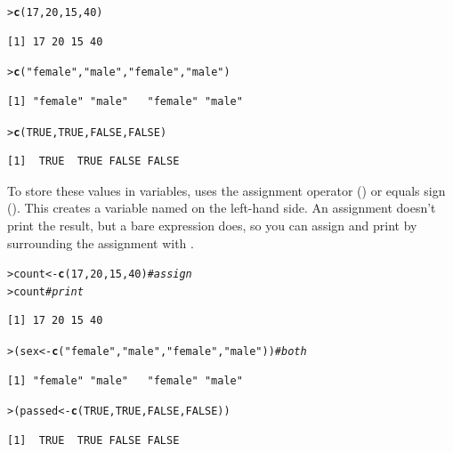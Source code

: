 \documentclass[10pt,krantz2]{krantz}\usepackage[]{graphicx}\usepackage[]{color}
\makeatletter
\newcommand{\hlnum}[1]{\textcolor[rgb]{0.686,0.059,0.569}{#1}}%
\newcommand{\hlstr}[1]{\textcolor[rgb]{0.192,0.494,0.8}{#1}}%
\newcommand{\hlcom}[1]{\textcolor[rgb]{0.678,0.584,0.686}{\textit{#1}}}%
\newcommand{\hlstd}[1]{\textcolor[rgb]{0.345,0.345,0.345}{#1}}%
\newcommand{\hlkwb}[1]{\textcolor[rgb]{0.69,0.353,0.396}{#1}}%
\newcommand{\hlkwd}[1]{\textcolor[rgb]{0.737,0.353,0.396}{\textbf{#1}}}%
\newenvironment{kframe}{%
 \def\at@end@of@kframe{}%
 \ifinner\ifhmode%
  \def\at@end@of@kframe{\end{minipage}}%
  \begin{minipage}{\columnwidth}%
 \fi\fi%
 \def\FrameCommand##1{\hskip\@totalleftmargin \hskip-\fboxsep
 \colorbox{shadecolor}{##1}\hskip-\fboxsep
     \hskip-\linewidth \hskip-\@totalleftmargin \hskip\columnwidth}%
 \MakeFramed {\advance\hsize-\width
   \@totalleftmargin\z@ \linewidth\hsize
   \@setminipage}}%
 {\par\unskip\endMakeFramed%
 \at@end@of@kframe}
\newenvironment{knitrout}{}{} %
\renewenvironment{knitrout}{\small\renewcommand{\baselinestretch}{.85}}{} %
\makeatother
\begin{document}
\begin{knitrout}
\color{fgcolor}\begin{kframe}
\begin{alltt}
\hlstd{> }\hlkwd{c}\hlstd{(}\hlnum{17}\hlstd{,} \hlnum{20}\hlstd{,} \hlnum{15}\hlstd{,} \hlnum{40}\hlstd{)}
\end{alltt}
\begin{verbatim}
[1] 17 20 15 40
\end{verbatim}
\begin{alltt}
\hlstd{> }\hlkwd{c}\hlstd{(}\hlstr{"female"}\hlstd{,} \hlstr{"male"}\hlstd{,} \hlstr{"female"}\hlstd{,} \hlstr{"male"}\hlstd{)}
\end{alltt}
\begin{verbatim}
[1] "female" "male"   "female" "male"  
\end{verbatim}
\begin{alltt}
\hlstd{> }\hlkwd{c}\hlstd{(}\hlnum{TRUE}\hlstd{,} \hlnum{TRUE}\hlstd{,} \hlnum{FALSE}\hlstd{,} \hlnum{FALSE}\hlstd{)}
\end{alltt}
\begin{verbatim}
[1]  TRUE  TRUE FALSE FALSE
\end{verbatim}
\end{kframe}
\end{knitrout}

To store these values in variables, \R uses the assignment operator (\code{<-})
or equals sign (\code{=}). This creates a variable named on the left-hand side.
An assignment doesn't print the result, but a bare expression does, so you can
assign and print by surrounding the assignment with \code{()}.

\begin{knitrout}
\color{fgcolor}\begin{kframe}
\begin{alltt}
\hlstd{> }\hlstd{count} \hlkwb{<-} \hlkwd{c}\hlstd{(}\hlnum{17}\hlstd{,} \hlnum{20}\hlstd{,} \hlnum{15}\hlstd{,} \hlnum{40}\hlstd{)}                       \hlcom{# assign}
\hlstd{> }\hlstd{count}                                            \hlcom{# print}
\end{alltt}
\begin{verbatim}
[1] 17 20 15 40
\end{verbatim}
\begin{alltt}
\hlstd{> }\hlstd{(sex} \hlkwb{<-} \hlkwd{c}\hlstd{(}\hlstr{"female"}\hlstd{,} \hlstr{"male"}\hlstd{,} \hlstr{"female"}\hlstd{,} \hlstr{"male"}\hlstd{))}   \hlcom{# both}
\end{alltt}
\begin{verbatim}
[1] "female" "male"   "female" "male"  
\end{verbatim}
\begin{alltt}
\hlstd{> }\hlstd{(passed} \hlkwb{<-} \hlkwd{c}\hlstd{(}\hlnum{TRUE}\hlstd{,} \hlnum{TRUE}\hlstd{,} \hlnum{FALSE}\hlstd{,} \hlnum{FALSE}\hlstd{))}
\end{alltt}
\begin{verbatim}
[1]  TRUE  TRUE FALSE FALSE
\end{verbatim}
\end{kframe}
\end{knitrout}
\end{document}
